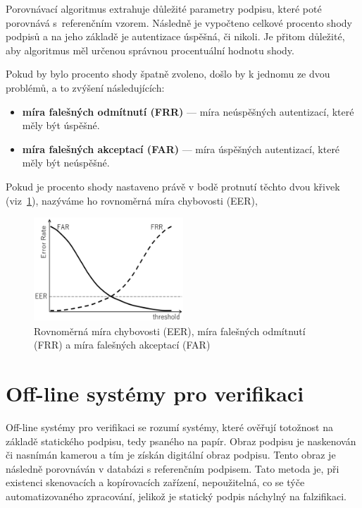 Porovnávací algoritmus extrahuje důležité parametry podpisu, které poté porovnává s~referenčním vzorem. 
Následně je vypočteno celkové procento shody podpisů a na jeho základě je autentizace úspěšná, či nikoli.
Je přitom důležité, aby algoritmus měl určenou správnou procentuální hodnotu shody. 

Pokud by bylo procento shody špatně zvoleno, došlo by k jednomu ze dvou problémů, a to zvýšení následujících:
\begin{itemize}
  \item \textbf{míra falešných odmítnutí (FRR)} --- míra neúspěšných autentizací, které měly být úspěšné.
  \item \textbf{míra falešných akceptací (FAR)} --- míra úspěšných autentizací, které měly být neúspěšné.
\end{itemize}

Pokud je procento shody nastaveno právě v bodě protnutí těchto dvou křivek (viz~\ref{fig:FAR_FRR}), nazýváme ho rovnoměrná míra chybovosti (EER), 

\begin{figure}[h]
  \centering
  \includegraphics[width=0.5\textwidth]{obrazky-figures/FAR_FRR.png}
  \caption{Rovnoměrná míra chybovosti (EER), míra falešných odmítnutí (FRR) a míra falešných akceptací (FAR)~\cite{cursorinsight_frr_fa}} %
  \label{fig:FAR_FRR}
\end{figure}

\newpage

\section{Off-line systémy pro verifikaci}
Off-line systémy pro verifikaci se rozumí systémy, které ověřují totožnost na základě statického podpisu, tedy psaného na papír.  %
Obraz podpisu je naskenován či nasnímán kamerou a tím je získán digitální obraz podpisu.                                          %
Tento obraz je následně porovnáván v databázi s referenčním podpisem.                                                             %
Tato metoda je, při existenci skenovacích a kopírovacích zařízení, nepoužitelná, co se týče automatizovaného zpracování, jelikož je statický podpis náchylný na falzifikaci.~\cite{RakRoman2008}%

